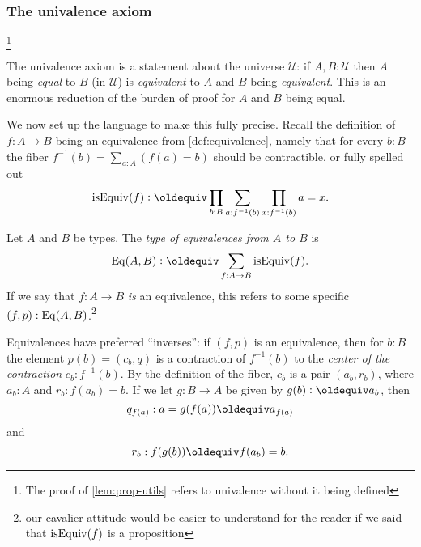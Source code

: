 \begin{definition}





\subsubsection{The univalence axiom}\label{sec:univax}\footnote{The proof of \cref{lem:prop-utils} refers to univalence without it being defined}

The univalence axiom is a statement about the universe $\mathcal U$: if $A,B:\mathcal U$ then $A$ being \emph{equal} to $B$ (in $\mathcal U$) is \emph{equivalent} to $A$ and $B$ being \emph{equivalent}.  This is an enormous reduction of the burden of proof for $A$ and $B$ being equal. 

We now set up the language to make this fully precise.  Recall the definition of $f:A\to B$ being an equivalence from \cref{def:equivalence}, namely that for every $b:B$ the fiber $f^{-1}(b)=\sum_{a:A}(f(a)=b)$ should be contractible, or fully spelled out
$$\isEq(f)\defequi \prod_{b:B}\sum_{a:f^{-1}(b)}\prod_{x:f^{-1}(b)}a=x.$$

\begin{definition}\label{def:typeofeq}
  Let $A$ and $B$ be types.  The \emph{type of equivalences from $A$ to $B$} is
  $$\Eq(A,B)\defequi\sum_{f:A\to B}\isEq(f).$$
If we say that $f:A\to B$ \emph{is} an equivalence, this refers to some specific $(f,p):\mathrm{Eq}(A,B)$.\footnote{our cavalier attitude would be easier to understand for the reader if we said that $\mathrm{isEquiv}(f)$ is a proposition}
\end{definition}
\begin{remark}\label{remark:inversetoeq}
  Equivalences have preferred ``inverses'': if $(f,p)$ is an equivalence, then for $b:B$ the element $p(b)=(c_b,q)$ is a contraction of $f^{-1}(b)$ to the \emph{center of the contraction} $c_b:f^{-1}(b)$. By the definition of the fiber, $c_b$ is a pair $(a_b,r_b)$, where $a_b:A$ and $r_b:f(a_b)=b$. If we let $g:B\to A$ be given by $g(b)\defequi a_b$, then 
$$q_{f(a)}:a=g(f(a))\oldequiv a_{f(a)}$$ and  
$$r_b:f(g(b))\oldequiv f(a_b)= b.$$


\end{remark}
\end{definition}
